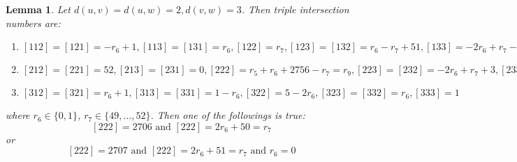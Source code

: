 \documentclass{article}
\newtheorem{lemma}{Lemma}
\theoremstyle{definition}
\theoremstyle{definition}
\theoremstyle{remark}
\begin{document}
\begin{lemma} Let $d(u,v) = d(u, w) = 2, d(v,w) = 3$. Then triple intersection numbers are:
    \begin{enumerate}
	\item $[112] = [121] = -r_6 + 1, [113] = [131] = r_6, [122] = r_7, [123] = [132] = r_6 - r_7 + 51, [133] = -2r_6 + r_7 - 49$
	\item $[212] = [221] = 52, [213] = [231] = 0, [222] = r_5 + r_6 + 2756 - r_7 = r_9, [223] = [232] = -2r_6 + r_7 + 3, [233] = 2r_6 - r_7 + 102$
	\item $[312] = [321] = r_6 + 1, [313] = [331] = 1 - r_6, [322] = 5 - 2 r_6, [323] = [332] = r_6, [333] = 1$
    \end{enumerate}
    where $r_6 \in \{0,1\}$, $r_7 \in \{49, ..., 52 \}$. Then one of the followings is true:
    \[[222] = 2706 \text{ and } [222] = 2r_6 + 50 = r_7 \]
    or
    \[[222] = 2707 \text{ and } [222] = 2r_6 + 51 = r_7 \text{ and } r_6 = 0 \]
\end{lemma}
\end{document}
